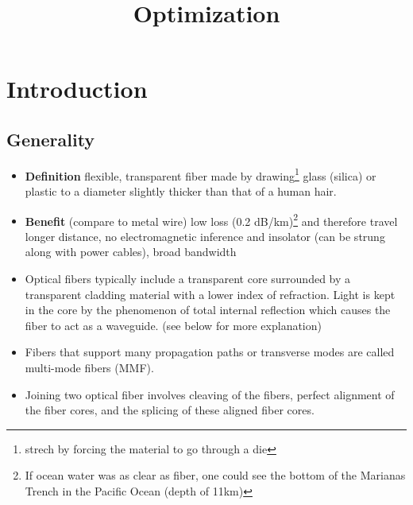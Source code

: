 \documentclass[twocolumn]{article}
\title{Optimization}
\date{\vspace{-6ex}}
\numberwithin{equation}{section}
\begin{document}
\maketitle



\section{Introduction}

	\subsection{Generality}
\begin{itemize}
	\item \textbf{Definition} flexible, transparent fiber made by  drawing\footnote{strech by forcing the material to go through a die} glass (silica) or plastic to a diameter slightly thicker than that of a human hair.
	\item \textbf{Benefit} (compare to metal wire) low loss (0.2 dB/km)\footnote{If ocean water was as clear as fiber, one could see the bottom of the Marianas Trench in the Pacific Ocean (depth of 11km)} and therefore travel longer distance, no electromagnetic inference and insolator (can be strung along with power cables), broad bandwidth
	\item Optical fibers typically include a transparent core surrounded by a transparent cladding material with a lower index of refraction. Light is kept in the core by the phenomenon of total internal reflection which causes the fiber to act as a waveguide. (see below for more explanation)
	\item Fibers that support many propagation paths or transverse modes are called multi-mode fibers (MMF).
	\item Joining two optical fiber involves cleaving of the fibers, perfect alignment of the fiber cores, and the splicing of these aligned fiber cores.
\end{itemize}
\end{document}
